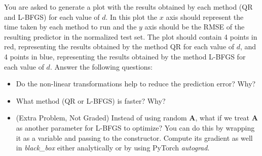 \documentclass[submit]{harvardml}
\begin{document}
\begin{problem}[14pts]
You are asked to generate a plot
with the results obtained by each method (QR and L-BFGS)
for each value of $d$. In this plot
the $x$ axis should represent the time taken by each method to
run and the $y$ axis should be the RMSE of the resulting predictor in the
normalized test set. The plot should
contain 4 points in red, representing the results obtained by the method QR for
each value of $d$, and 4 points in blue, representing the results obtained
by the method L-BFGS for each value of $d$. Answer the following questions:
\begin{itemize}
\item Do the non-linear transformations help to reduce the prediction error? Why?
\item What method (QR or L-BFGS) is faster? Why?
\item (Extra Problem, Not Graded) Instead of using random $\mathbf{A}$, what if we treat
  $\mathbf{A}$ as another parameter for L-BFGS to optimize? You can do
  this by wrapping it as a variable and passing to the
  constructor. Compute its gradient as well in \textit{black\_box}
  either analytically or by using PyTorch \textit{autograd}.
\end{itemize}
\vspace{0.1cm}
\end{problem}
\end{document}
